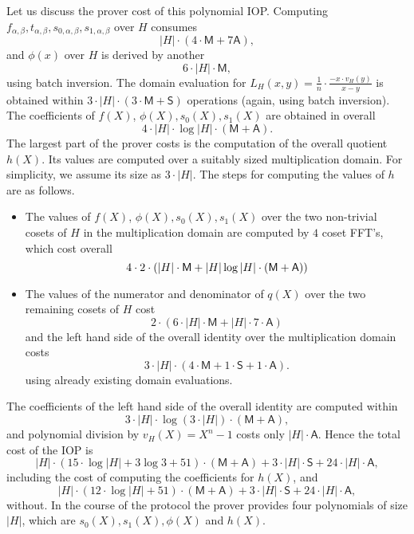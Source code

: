 \documentclass[11pt]{article}
\theoremstyle{definition}
\theoremstyle{remark}
\begin{document}
Let us discuss the prover cost of this polynomial IOP.
Computing $f_{\alpha,\beta}, t_{\alpha,\beta}, s_{0,\alpha,\beta}, s_{1,\alpha,\beta}$ over $H$ consumes 
\[
|H|\cdot (4\cdot \mathsf M + 7 \mathsf A),
\]
and $\phi(x)$ over $H$ is derived by another 
\[
6\cdot |H|\cdot \mathsf M,
\] 
using batch inversion. 
The domain evaluation for $L_H(x, y) = \frac{1}{n}\cdot \frac{- x \cdot v_H(y)}{x- y}$ is obtained within $3\cdot |H|\cdot (3\cdot \mathsf M + \mathsf S)$ operations (again, using batch inversion).
The coefficients of $f(X)$, $\phi(X), s_0(X), s_1(X)$ are obtained in overall  
\[
4\cdot |H|\cdot \log|H|\cdot (\mathsf M + \mathsf A).
\] 
The largest part of the prover costs is the computation of the overall quotient $h(X)$.
Its values are computed over a suitably sized multiplication domain. 
For simplicity, we assume its size as $3\cdot |H|$.
The steps for computing the values of $h$ are as follows.
\begin{itemize}
\item 
The values of $f(X)$, $\phi(X), s_0(X), s_1(X)$ over the two non-trivial cosets of $H$ in the multiplication domain are computed by $4$ coset FFT's, which cost overall
\[
4\cdot 2\cdot ( |H| \cdot \textsf M + |H|\log|H|\cdot (\mathsf M + \mathsf A))
\] 
\item
The values of the numerator and denominator of $q(X)$ over the two remaining cosets of $H$ cost
\[
2\cdot (6 \cdot |H|\cdot \mathsf M +  |H| \cdot 7\cdot \mathsf A)  
\]
and the left hand side of the overall identity over the multiplication domain costs 
\[
3\cdot |H|\cdot (4 \cdot\mathsf M + 1\cdot\mathsf S + 1\cdot \mathsf A).
\]
using already existing domain evaluations.
\end{itemize}
The coefficients of the left hand side of the overall identity are computed within
\[
3\cdot |H| \cdot \log(3\cdot |H|)\cdot (\mathsf M + \mathsf A),
\]
and polynomial division by $v_H(X)= X^n - 1$ costs only $|H|\cdot \mathsf A$.
Hence the total cost of the IOP is 
\begin{equation}
\label{e:UV:lookup:cost}
|H|\cdot  (15\cdot \log |H| + 3\log 3 + 51) \cdot (\mathsf M + \mathsf A) + 3\cdot |H|\cdot\mathsf S + 24\cdot |H|\cdot \mathsf A,
\end{equation}
including the cost of computing the coefficients for $h(X)$, and 
\begin{equation}
\label{e:UV:lookup:cost:without:h}
|H|\cdot  (12\cdot \log |H|  + 51) \cdot (\mathsf M + \mathsf A) + 3\cdot |H|\cdot\mathsf S + 24\cdot |H|\cdot \mathsf A,
\end{equation}
without.
In the course of the protocol the prover provides four polynomials of size $|H|$, which are $s_0(X), s_1(X), \phi(X)$ and $h(X)$.
\end{document}
